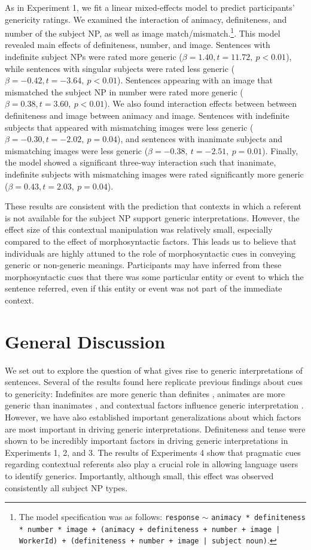 \documentclass[10pt,letterpaper]{article}
\begin{document}
As in Experiment 1, we fit a linear mixed-effects model to predict participants' genericity ratings. We examined the interaction of animacy, definiteness, and number of the subject NP, as well as image match/mismatch.\footnote{The model specification was as follows: \texttt{response} \(\sim\) \texttt{animacy * definiteness * number * image + (animacy + definiteness + number + image | WorkerId) + (definiteness + number + image | subject noun)}.}. This model revealed main effects of definiteness, number, and image. Sentences with indefinite subject NPs were rated more generic (\(\beta = 1.40, t = 11.72,~p < 0.01\)), while sentences with singular subjects were rated less generic (\(\beta = -0.42, t = -3.64,~p < 0.01\)). Sentences appearing with an image that mismatched the subject NP in number were rated more generic (\(\beta = 0.38, t = 3.60,~p < 0.01\)). We also found interaction effects between between definiteness and image between animacy and image. Sentences with indefinite subjects that appeared with mismatching images were less generic (\(\beta = -0.30, t = -2.02,~p = 0.04\)), and sentences with inanimate subjects and mismatching images were less generic (\(\beta = -0.38,~t=-2.51,~p=0.01\)). Finally, the model showed a significant three-way interaction such that inanimate, indefinite subjects with mismatching images were rated significantly more generic (\(\beta = 0.43, t = 2.03,~p = 0.04\)).

These results are consistent with the prediction that contexts in which a referent is not available for the subject NP support generic interpretations. However, the effect size of this contextual manipulation was relatively small, especially compared to the effect of morphosyntactic factors. This leads us to believe that individuals are highly attuned to the role of morphosyntactic cues in conveying generic or non-generic meanings. Participants may have inferred from these morphosyntactic cues that there was some particular entity or event to which the sentence referred, even if this entity or event was not part of the immediate context.

\section{General Discussion}

We set out to explore the question of what gives rise to generic interpretations of sentences. Several of the results found here replicate previous findings about cues to genericity: Indefinites are more generic than definites \cite{Cimpian:2011, Gelman:2003}, animates are more generic than inanimates \cite{Brandone:2009}, and contextual factors influence generic interpretation \cite{Gelman:2003}. However, we have also established important generalizations about which factors are most important in driving generic interpretations. Definiteness and tense were shown to be incredibly important factors in driving generic interpretations in Experiments 1, 2, and 3. The results of Experiments 4 show that pragmatic cues regarding contextual referents also play a crucial role in allowing language users to identify generics. Importantly, although small, this effect was observed consistently all subject NP types. 
\end{document}
